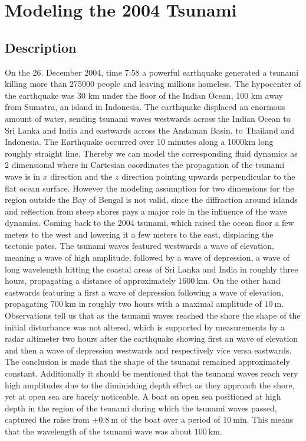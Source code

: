 \section{Modeling the 2004 Tsunami}
\subsection{Description}
On the 26. December 2004, time 7:58 a powerful earthquake generated a tsunami
killing more than 275000 people and leaving millions homeless. The
hypocenter of the earthquake was 30 km under the floor of the Indian Ocean,
100 km away from Sumatra, an island in Indonesia. The earthquake displaced
an enormous amount of water, sending tsunami waves westwards across the
Indian Ocean to Sri Lanka and India and eastwards across the Andaman Basin.
to Thailand and Indonesia. The Earthquake occurred over 10 minutes along a
1000km long roughly straight line. Thereby we can model the corresponding
fluid dynamics as 2 dimensional where in Cartesian coordinates the
propagation of the tsunami wave is in $x$ direction and the $z$ direction
pointing upwards perpendicular to the flat ocean surface. However the
modeling assumption for two dimensions for the region outside the Bay of
Bengal is not valid, since the diffraction around islands and reflection from
steep shores pays a major role in the influence of the wave dynamics. Coming
back to the $2004$ tsunami, which raised the ocean floor a few meters to the
west and lowering it a few meters to the east, displacing the tectonic pates.
The tsunami waves featured westwards a wave of elevation, meaning a wave of
high amplitude, followed by a wave of depression, a wave of long wavelength
hitting the coastal areas of Sri Lanka and India in roughly three hours,
propagating a distance of approximately $1600\ \text{km}$. On the other hand
eastwards featuring a first a wave of depression following a wave of
elevation, propagating $700\ \text{km}$ in roughly two hours with a maximal
amplitude of $10\ \text{m}$. Observations tell us that as the tsunami waves
reached the shore the shape of the initial disturbance was not altered, which
is supported by measurements by a radar altimeter two hours after the
earthquake showing first an wave of elevation and then a wave of depression
westwards and respectively vice versa eastwards. The conclusion is made that
the shape of the tsunami remained approximately constant. Additionally it
should be mentioned that the tsunami waves reach very high amplitudes due to
the diminishing depth effect as they approach the shore, yet at open sea are
barely noticeable. A boat on open sea positioned at high depth in the region
of the tsunami during which the tsunami waves passed, captured the raise
from $\pm 0.8\ \text{m}$ of the boat over a period of $10\ \text{min}$.
This means that the wavelength of the tsunami wave was about $100\
\text{km}$.
